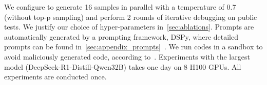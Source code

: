   We configure \frameworkname to generate 16 samples in parallel with a temperature of 0.7 (without top-p sampling) and perform 2 rounds of iterative debugging on public tests. We justify our choice of hyper-parameters in~\cref{sec:ablations}. Prompts are automatically generated by a prompting framework, DSPy, where detailed prompts can be found in~\cref{sec:appendix_prompts}~\citep{khattab2023dspy}. We run codes in a sandbox to avoid maliciously generated code, according to~\citep{chen2021evaluating}. Experiments with the largest model (DeepSeek-R1-Distill-Qwen32B) takes one day on 8 H100 GPUs. All experiments are conducted once. %


